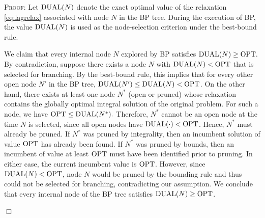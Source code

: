\documentclass{article}
\newenvironment{proof}[1][]
   {\textsc{Proof#1: }}
   {\hfill$\Box$\smallskip}
\newcommand{\OPT}{\textup{OPT}}
\newcommand{\LAG}{\textup{DUAL}}
\begin{document}
\begin{proof}
Let $\LAG(N)$ denote the exact optimal value of the relaxation
\eqref{eq:lagrelax} associated with node $N$ in the BP tree.
During the execution of BP, the value $\LAG(N)$ is used as the
node-selection criterion under the best-bound rule.

We claim that every internal node $N$ explored by BP satisfies
$\LAG(N) \ge \OPT.$
By contradiction, suppose there exists a node $N$ with
$\LAG(N) < \OPT$ that is selected for branching. By the best-bound
rule, this implies that for every other open node $N'$ in the BP tree, $\LAG(N') \le \LAG(N) < \OPT$.
On the other hand, there exists at least one node $N^*$ (open or pruned) whose
relaxation contains the globally optimal integral solution of the original
problem. For such a node, we have
$\OPT \le \LAG(N^*).$
Therefore, $N^*$ cannot be an open node at the time $N$ is selected, since all
open nodes have $\LAG(\cdot) < \OPT$. Hence, $N^*$ must already be
pruned.
If $N^*$ was pruned by integrality, then an incumbent solution of value $\OPT$
has already been found. If $N^*$ was pruned by bounds, then an incumbent of
value at least $\OPT$ must have been identified prior to pruning. In either
case, the current incumbent value is $\OPT$.
However, since $\LAG(N) < \OPT$, node $N$ would be pruned by the
bounding rule and thus could not be selected for branching, contradicting our
assumption. We conclude that every internal node of the BP tree satisfies
$\LAG(N) \ge \OPT$.


\end{proof}
\end{document}
